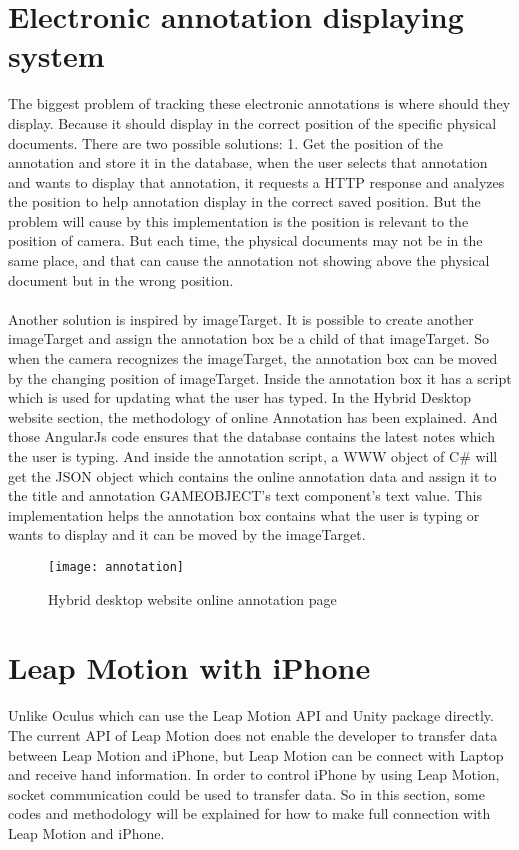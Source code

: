 \section{Electronic annotation displaying system}
The biggest problem of tracking these electronic annotations is where should they display. Because it should display in the correct position of the specific physical documents. There are two possible solutions: 1. Get the position of the annotation and store it in the database, when the user selects that annotation and wants to display that annotation, it requests a HTTP response and analyzes the position to help annotation display in the correct saved position. But the problem will cause by this implementation is the position is relevant to the position of camera. But each time, the physical documents may not be in the same place, and that can cause the annotation not showing above the physical document but in the wrong position. 
\\
\\
Another solution is inspired by imageTarget. It is possible to create another imageTarget and assign the annotation box be a child of that imageTarget. So when the camera recognizes the imageTarget, the annotation box can be moved by the changing position of imageTarget. Inside the annotation box it has a script which is used for updating what the user has typed. In the Hybrid Desktop website section, the methodology of online Annotation has been explained. And those AngularJs code ensures that the database contains the latest notes which the user is typing. And inside the annotation script, a WWW object of C\# will get the JSON object which contains the online annotation data and assign it to the title and annotation GAMEOBJECT’s text component’s text value. This implementation helps the annotation box contains what the user is typing or wants to display and it can be moved by the imageTarget.
\begin{figure}[h]
    \centering
    \texttt{[image: annotation]}
    \caption{Hybrid desktop website online annotation page}
    \label{fig:mesh1}
\end{figure}

\section{Leap Motion with iPhone}

Unlike Oculus which can use the Leap Motion API and Unity package directly. The current API of Leap Motion does not enable the developer to transfer data between Leap Motion and iPhone, but Leap Motion can be connect with Laptop and receive hand information. In order to control iPhone by using Leap Motion, socket communication could be used to transfer data. So in this section, some codes and methodology will be explained for how to make full connection with Leap Motion and iPhone. 

